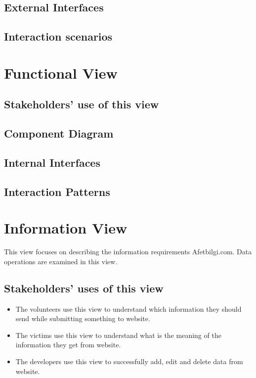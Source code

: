 \subsection{External Interfaces}

\subsection{Interaction scenarios}

\section{Functional View}

\subsection{Stakeholders' use of this view}

\subsection{Component Diagram}

\subsection{Internal Interfaces}

\subsection{Interaction Patterns}

\section{Information View}
This view focuses on describing the information requirements Afetbilgi.com. Data operations are examined in this view.

\subsection{Stakeholders' uses of this view}
\begin{itemize}
    \item The volunteers use this view to understand which information they should send while submitting something to website.
    \item The victims use this view to understand what is the meaning of the information they get from website.
    \item The developers use this view to successfully add, edit and delete data from website.
\end{itemize}

